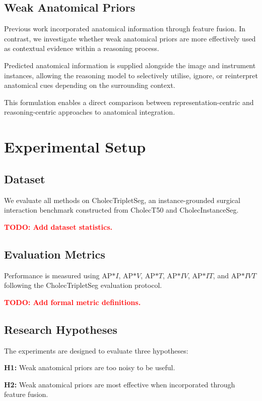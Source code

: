 \documentclass[11pt]{article}
\newcommand{\todo}[1]{\textcolor{red}{\textbf{TODO: #1}}}
\begin{document}
\subsection{Weak Anatomical Priors}

Previous work incorporated anatomical information through feature fusion. In contrast, we investigate whether weak anatomical priors are more effectively used as contextual evidence within a reasoning process.

Predicted anatomical information is supplied alongside the image and instrument instances, allowing the reasoning model to selectively utilise, ignore, or reinterpret anatomical cues depending on the surrounding context.

This formulation enables a direct comparison between representation-centric and reasoning-centric approaches to anatomical integration.

\section{Experimental Setup}

\subsection{Dataset}

We evaluate all methods on CholecTripletSeg, an instance-grounded surgical interaction benchmark constructed from CholecT50 and CholecInstanceSeg.

\todo{Add dataset statistics.}

\subsection{Evaluation Metrics}

Performance is measured using AP$*I$, AP$*V$, AP$*T$, AP$*{IV}$, AP$*{IT}$, and AP$*{IVT}$ following the CholecTripletSeg evaluation protocol.

\todo{Add formal metric definitions.}

\subsection{Research Hypotheses}

The experiments are designed to evaluate three hypotheses:

\textbf{H1:} Weak anatomical priors are too noisy to be useful.

\textbf{H2:} Weak anatomical priors are most effective when incorporated through feature fusion.
\end{document}
